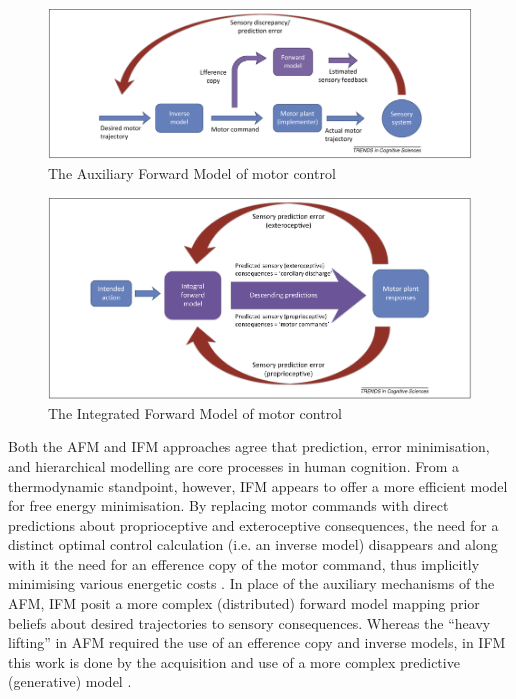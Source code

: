 \begin{CJK}{UTF8}{gbsn}
\begin{figure}[htbp]
  \begin{center}
    \includegraphics[scale=.3]{images/AFM.png}
      \caption{The Auxiliary Forward Model of motor control}
        \label{fig:AFM}
   \end{center}
\end{figure}

\begin{figure}[htbp]
  \begin{center}
    \includegraphics[scale=.3]{images/IFM.png}
      \caption{The Integrated Forward Model of motor control}
        \label{fig:IFM}
   \end{center}
\end{figure}


Both the AFM and IFM approaches agree that prediction, error minimisation, and hierarchical modelling are core processes in human cognition. From a thermodynamic standpoint, however, IFM appears to offer a more efficient model for free energy minimisation.  By replacing motor commands with direct predictions about proprioceptive and exteroceptive consequences, the need for a distinct optimal control calculation (i.e. an inverse model) disappears and along with it the need for an efference copy of the motor command, thus implicitly minimising various energetic costs \citep{Pickering2014,Friston2010}.   In place of the auxiliary mechanisms of the AFM, IFM posit a more complex (distributed) forward model mapping prior beliefs about desired trajectories to sensory consequences.  Whereas the ``heavy lifting'' in AFM required the use of an efference copy and inverse models, in IFM this work is done by the acquisition and use of a more complex predictive (generative) model \citep{Pickering2014}.







\end{CJK}
